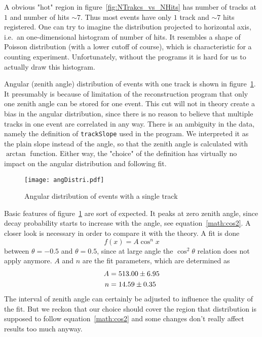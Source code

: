 A obvious "hot" region in figure~\ref{fig:NTrakcs_vs_NHits} has number of tracks at $1$ and number of hits $\sim 7$. Thus most events have only $1$ track and $\sim 7$ hits registered. One can try to imagine the distribution projected to horizontal axis, i.e.~an one-dimensional histogram of number of hits. It resembles a shape of Poisson distribution (with a lower cutoff of course), which is characteristic for a counting experiment. Unfortunately, without the programs it is hard for us to actually draw this histogram.

Angular (zenith angle) distribution of events with one track is shown in figure~\ref{fig:angDistri}. It presumably is because of limitation of the reconstruction program that only one zenith angle can be stored for one event. This cut will not in theory create a bias in the angular distribution, since there is no reason to believe that multiple tracks in one event are correlated in any way. There is an ambiguity in the data, namely the definition of \verb|trackSlope| used in the program. We interpreted it as the plain slope instead of the angle, so that the zenith angle is calculated with $\arctan$ function. Either way, the "choice" of the definition has virtually no impact on the angular distribution and following fit.

\begin{figure}[ht]
	\centering
	\texttt{[image: angDistri.pdf]}
	\caption{Angular distribution of events with a single track}%
	\label{fig:angDistri}
\end{figure}
Basic features of figure~\ref{fig:angDistri} are sort of expected. It peaks at zero zenith angle, since decay probability starts to increase with the angle, see equation~\ref{math:cos2}. A closer look is necessary in order to compare it with the theory. A fit is done
\begin{equation*}
	f(x) = A  \cos^n x
\end{equation*}
between $\theta=-0.5$ and $\theta=0.5$, since at large angle the $\cos^2 \theta$ relation does not apply anymore. $A$ and $n$ are the fit parameters, which are determined as
\begin{align*}
	A &= \num{513.00 +- 6.95} \\
	n &= \num{14.59 +- 0.35} 
\end{align*}
The interval of zenith angle can certainly be adjusted to influence the quality of the fit. But we reckon that our choice should cover the region that distribution is supposed to follow equation~\ref{math:cos2} and some changes don't really affect results too much anyway.

